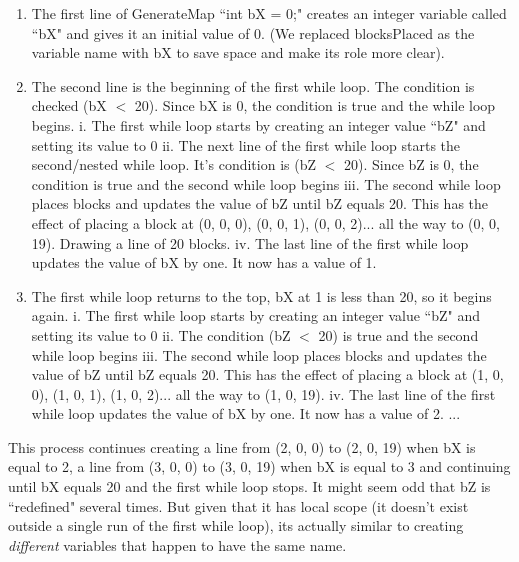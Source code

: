 \documentclass{article}
\begin{document}
\begin{enumerate}
 \item The first line of GenerateMap ``int bX = 0;" creates an integer variable called ``bX" and gives it an initial value of 0. (We replaced blocksPlaced as the variable name with bX to save space and make its role more clear).
 \item The second line is the beginning of the first while loop. The condition is checked (bX $<$ 20). Since bX is 0, the condition is true and the while loop begins.
 \newline
 \newline\indent i. The first while loop starts by creating an integer value ``bZ" and setting its value to 0
 \newline\indent ii. The next line of the first while loop starts the second/nested while loop. It's condition is (bZ $<$ 20). Since bZ is 0, the condition is true and the second while loop begins
 \newline\indent iii. The second while loop places blocks and updates the value of bZ until bZ equals 20. This has the effect of placing a block at (0, 0, 0), (0, 0, 1), (0, 0, 2)... all the way to (0, 0, 19). Drawing a line of 20 blocks.
 \newline\indent iv. The last line of the first while loop updates the value of bX by one. It now has a value of 1. 
 \item The first while loop returns to the top, bX at 1 is less than 20, so it begins again.
 \newline
  \newline\indent i. The first while loop starts by creating an integer value ``bZ" and setting its value to 0
 \newline\indent ii. The condition (bZ $<$ 20) is true and the second while loop begins
 \newline\indent iii. The second while loop places blocks and updates the value of bZ until bZ equals 20. This has the effect of placing a block at (1, 0, 0), (1, 0, 1), (1, 0, 2)... all the way to (1, 0, 19). 
  \newline\indent iv. The last line of the first while loop updates the value of bX by one. It now has a value of 2.
 \newline ...
 \end{enumerate}
 
 This process continues creating a line from (2, 0, 0) to (2, 0, 19) when bX is equal to 2, a line from (3, 0, 0) to (3, 0, 19) when bX is equal to 3 and continuing until bX equals 20 and the first while loop stops. It might seem odd that bZ is ``redefined" several times. But given that it has local scope (it doesn't exist outside a single run of the first while loop), its actually similar to creating \textit{different} variables that happen to have the same name. 
\end{document}
